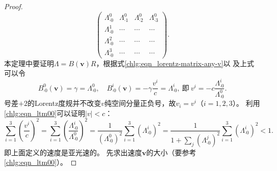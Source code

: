 \begin{proof}
\begin{equation}
\begin{pmatrix}
            \Lambda^0_{\cdot 0} & \Lambda^0_{\cdot 1} & \Lambda^0_{\cdot 2}& \Lambda^0_{\cdot 3}\\
            \Lambda^1_{\cdot 0} & \cdots & \cdots& \cdots\\
            \Lambda^2_{\cdot 0} & \cdots & \cdots& \cdots\\
            \Lambda^3_{\cdot 0} & \cdots & \cdots& \cdots
        \end{pmatrix} .
    \end{equation}
    本定理中要证明$\Lambda=B(\boldsymbol{v})R$，根据式\eqref{chlg:eqn_lorentz-matrix-any-v}以
    及上式可以令
    \begin{equation}
        B^{0}_{\cdot 0}(\boldsymbol{v})=\gamma = \Lambda^0_{\cdot 0}, \quad
        B^{i}_{\cdot 0}(\boldsymbol{v})=-\gamma\frac{v^i}{c}= {\Lambda^i_{\cdot 0}}, \ \text{即}\
        {v^i}= - {c}\frac{\Lambda^i_{\cdot 0}}{\Lambda^0_{\cdot 0}}.
    \end{equation}
    号差$+2$的Lorentz度规并不改变$v$纯空间分量正负号，故$v_i=v^i$（$i=1,2,3$）。
    利用\eqref{chlg:eqn_ltm00}可以证明$|v|<c$：
    \begin{equation*}
        \sum_{i=1}^{3}\left( \frac{v^i}{c}\right)^2
        =\sum_{i=1}^{3}\left( \frac{\Lambda^i_{\cdot 0}}{\Lambda^0_{\cdot 0}}\right)^2
        =\frac{1}{(\Lambda^0_{\cdot 0})^2} \sum_{i=1}^{3}\left( {\Lambda^i_{\cdot 0}}\right)^2
        =\frac{1}{1+\sum_{j}\left( {\Lambda^j_{\cdot 0}}\right)^2}
        \sum_{i=1}^{3}\left( {\Lambda^i_{\cdot 0}}\right)^2    <1  .
    \end{equation*}
    即上面定义的速度是亚光速的。
    先求出速度$\boldsymbol{v}$的大小（要参考\eqref{chlg:eqn_ltm00}）。
    

\end{proof}
